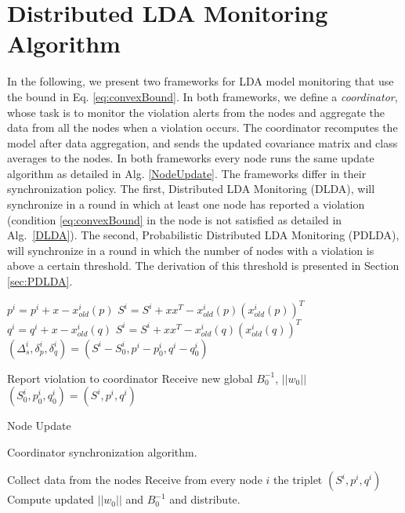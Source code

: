 \section{Distributed LDA Monitoring Algorithm}
In the following, we present two frameworks for LDA model monitoring that use
the bound in Eq. \ref{eq:convexBound}. 
In both frameworks, 
we define a \textit{coordinator}, whose task is to monitor the violation alerts from the nodes and aggregate the data from all the nodes when a violation occurs. The coordinator recomputes the model after data aggregation, and sends the updated covariance matrix 
and class averages to the nodes.
In both frameworks every node runs the same
update algorithm as detailed in Alg. \ref{NodeUpdate}.
The frameworks differ in their synchronization policy. 
The first, Distributed LDA Monitoring (DLDA), will synchronize in a round
in which at least one node has reported a violation (condition \ref{eq:convexBound} in the node is not satisfied as detailed in Alg.~\ref{DLDA}).
The second, Probabilistic Distributed LDA Monitoring (PDLDA), will synchronize in a round in which the number of nodes with a violation is above a certain
threshold.
The derivation of this threshold is presented in Section \ref{sec:PDLDA}.


\begin{algorithm}
\SetAlgoNoLine
{}
{ $p^i = p^i + x - x_{old}^i(p)$ \;
 $S^i = S^i +xx^T - x_{old}^i(p)(x_{old}^i(p))^T$}
\Else
{$q^i = q^i + x -x_{old}^i(q)$ \;
 $S^i = S^i +xx^T - x_{old}^i(q)(x_{old}^i(q))^T$ \;
$(\Delta_s^i,\delta^i_p,\delta_q^i) = (S^i-S^i_0,p^i-p^i_0,q^i-q^i_0)$ }

{Report violation to coordinator \;
Receive new global $B_0^{-1}$, $||w_0||$ \;
$(S_0^i,p_0^i,q_0^i) = (S^i,p^i,q^i)$ }

\caption{Node Update}

\label{NodeUpdate}
\end{algorithm}


\begin{algorithm}
\SetAlgoNoLine
\caption{Coordinator synchronization algorithm.}\label{DLDA}
{
Collect data from the nodes \;
Receive from every node $i$ the triplet $(S^i,p^i,q^i)$ \;
Compute updated $||w_0||$ and $B_0^{-1}$ and distribute.}
\end{algorithm}
%
